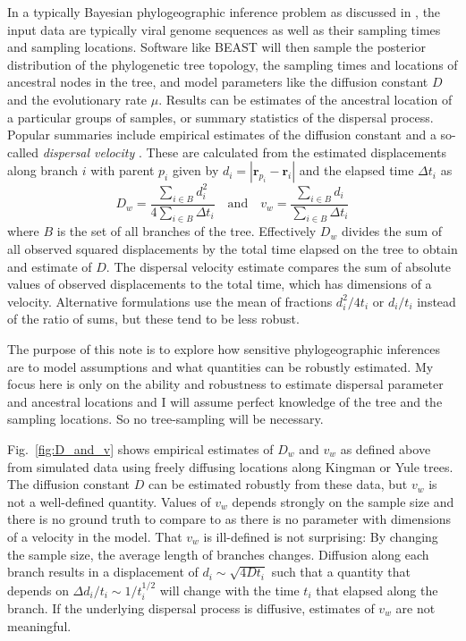 \documentclass[aps,rmp, onecolumn]{revtex4}
\newcommand{\rvec}{\mathbf{r}}
\begin{document}
In a typically Bayesian phylogeographic inference problem as discussed in \citet{pybus_unifying_2012}, the input data are typically viral genome sequences as well as their sampling times and sampling locations.
Software like BEAST will then sample the posterior distribution of the phylogenetic tree topology, the sampling times and locations of ancestral nodes in the tree, and model parameters like the diffusion constant $D$ and the evolutionary rate $\mu$.
Results can be estimates of the ancestral location of a particular groups of samples, or summary statistics of the dispersal process.
Popular summaries include empirical estimates of the diffusion constant  \citep{pybus_unifying_2012} and a so-called \emph{dispersal velocity} \citep{dellicour_using_2017}. These are calculated from the estimated displacements along branch $i$ with parent $p_i$ given by $d_i = |\rvec_{p_i} - \rvec_{i}|$ and the elapsed time $\Delta t_i$ as
\begin{equation}
    D_w = \frac{\sum_{i\in B}d_i^2}{4\sum_{i\in B} \Delta t_i} \quad \mathrm{and}  \quad v_w = \frac{\sum_{i\in B} d_i}{\sum_{i\in B} \Delta t_i}
\end{equation}
where $B$ is the set of all branches of the tree.
Effectively $D_w$ divides the sum of all observed squared displacements by the total time elapsed on the tree to obtain and estimate of $D$.
The dispersal velocity estimate compares the sum of absolute values of observed displacements to the total time, which has dimensions of a velocity.
Alternative formulations use the mean of fractions $d_i^2/4t_i$ or $d_i/t_i$ instead of the ratio of sums, but these tend to be less robust.


The purpose of this note is to explore how sensitive phylogeographic inferences are to model assumptions and what quantities can be robustly estimated.
My focus here is only on the ability and robustness to estimate dispersal parameter and ancestral locations and I will assume perfect knowledge of the tree and the sampling locations.
So no tree-sampling will be necessary.


Fig.~\ref{fig:D_and_v} shows empirical estimates of $D_w$ and $v_w$ as defined above from simulated data using freely diffusing locations along Kingman or Yule trees.
The diffusion constant $D$ can be estimated robustly from these data, but $v_w$ is not a well-defined quantity.
Values of $v_w$ depends strongly on the sample size and there is no ground truth to compare to as there is no parameter with dimensions of a velocity in the model.
That $v_w$ is ill-defined is not surprising: By changing the sample size, the average length of branches changes. Diffusion along each branch results in a displacement of $d_i \sim \sqrt{4Dt_i}$ such that a quantity that depends on $\Delta d_i / t_i \sim 1/t_i^{1/2}$ will change with the time $t_i$ that elapsed along the branch.
If the underlying dispersal process is diffusive, estimates of $v_w$ are not meaningful. 
\end{document}
